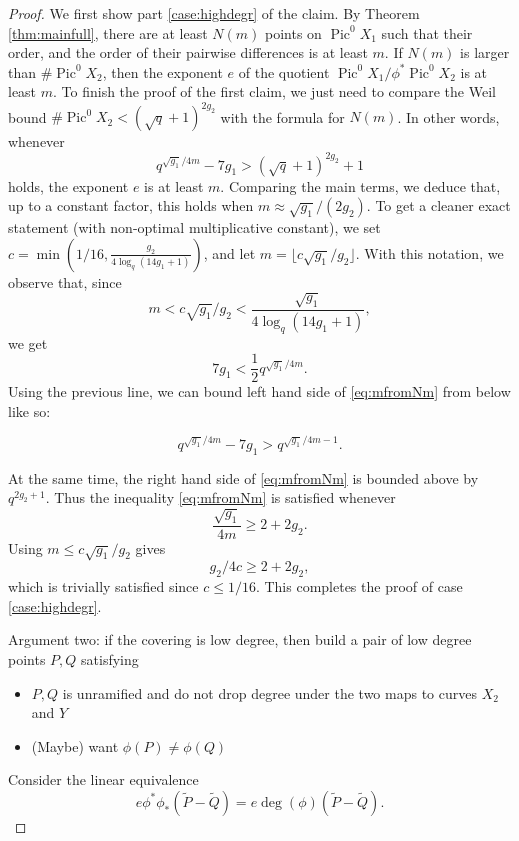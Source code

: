 \documentclass[11pt]{amsart}
\newcommand{\F}{\mathbb{F}}
\DeclareMathOperator{\Pic}{Pic}
\theoremstyle{definition}
\theoremstyle{remark}
\begin{document}
\begin{proof}
We first show part \eqref{case:highdegr} of the claim. By Theorem \ref{thm:mainfull}, there are at least $N(m)$ points on $\Pic^0 X_1$ such that their order, and the order of their pairwise differences is at least $m$. If $N(m)$ is larger than $\#\Pic^0 X_2$, then the exponent $e$ of the quotient $\Pic^0X_1/\phi^*\Pic^0 X_2$ is at least $m$. To finish the proof of the first claim, we just need to compare the Weil bound $\# \Pic^0 X_2 < (\sqrt{q}+1)^{2g_2}$ with the formula for $N(m)$. In other words, whenever
\begin{equation*}\label{eq:mfromNm}
q^{\sqrt{g_1}/4m}-7g_1 > (\sqrt{q}+1)^{2g_2}+1
\tag{$\diamond$}
\end{equation*}
 holds, the exponent $e$ is at least $m$. Comparing the main terms, we deduce that, up to a constant factor, this holds when $m \approx \sqrt{g_1}/(2g_2)$. To get a cleaner exact statement (with non-optimal multiplicative constant), we set $c=\min\left(1/16, \frac{g_2}{4\log_q(14g_1+1)}\right)$, and let $m=\lfloor c\sqrt{g_1}/g_2 \rfloor$. With this notation, we observe that, since \[m<c\sqrt{g_1}/g_2 < \frac{\sqrt{g_1}}{4\log_q(14g_1+1)},\] we get
 \begin{equation*}
     7g_1<\frac{1}{2}q^{\sqrt{g_1}/4m}.
\end{equation*}
Using the previous line, we can bound left hand side of \eqref{eq:mfromNm} from below like so:

\[q^{\sqrt{g_1}/4m}-7g_1>q^{\sqrt{g_1}/4m - 1}.\]

At the same time, the right hand side of \eqref{eq:mfromNm} is bounded above by $q^{2g_2+1}$. Thus the inequality \eqref{eq:mfromNm} is satisfied whenever \[\frac{\sqrt{g_1}}{4m} \geqslant 2+2g_2.\]
Using $m\leqslant  c\sqrt{g_1}/g_2$ gives 
\[g_2/4c\geqslant 2+2g_2,\] which is trivially satisfied since $c \leqslant 1/16$. This completes the proof of case \eqref{case:highdegr}.





\iffalse
    Argument two: if the covering is low degree, then build a pair of low degree points $P, Q$ satisfying 
    \begin{itemize}
        \item $P,Q$ is unramified and do not drop degree under the two maps to curves $X_2$ and $Y$ 
        \item (Maybe) want $\phi(P)\neq \phi(Q)$
    \end{itemize}
    Consider the linear equivalence 
    \[e \phi^*\phi_* (\tilde{P}-\tilde{Q})=e\deg(\phi) (\tilde{P}-\tilde{Q}).\]


\end{proof}
\end{document}
